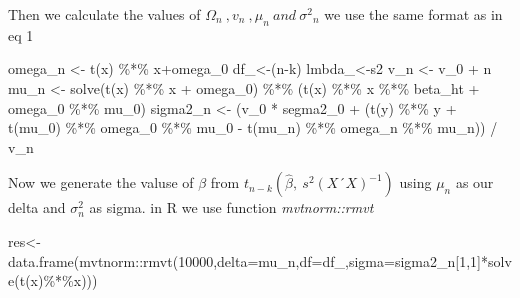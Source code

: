 \documentclass[
]{article}
\newenvironment{Shaded}{\begin{snugshade}}{\end{snugshade}}
\newcommand{\AttributeTok}[1]{\textcolor[rgb]{0.77,0.63,0.00}{#1}}
\newcommand{\DecValTok}[1]{\textcolor[rgb]{0.00,0.00,0.81}{#1}}
\newcommand{\FunctionTok}[1]{\textcolor[rgb]{0.00,0.00,0.00}{#1}}
\newcommand{\NormalTok}[1]{#1}
\newcommand{\OtherTok}[1]{\textcolor[rgb]{0.56,0.35,0.01}{#1}}
\newcommand{\SpecialCharTok}[1]{\textcolor[rgb]{0.00,0.00,0.00}{#1}}
\begin{document}
Then we calculate the values of
\(\Omega_n \ ,v_n \ ,\mu_n \ and \ \sigma{^2}{_n}\) we use the same
format as in eq 1

\begin{Shaded}
\begin{Highlighting}[]
\NormalTok{omega\_n }\OtherTok{\textless{}{-}} \FunctionTok{t}\NormalTok{(x) }\SpecialCharTok{\%*\%}\NormalTok{ x}\SpecialCharTok{+}\NormalTok{omega\_0}
\NormalTok{df\_}\OtherTok{\textless{}{-}}\NormalTok{(n}\SpecialCharTok{{-}}\NormalTok{k)}
\NormalTok{lmbda\_}\OtherTok{\textless{}{-}}\NormalTok{s2}
\NormalTok{v\_n }\OtherTok{\textless{}{-}}\NormalTok{ v\_0 }\SpecialCharTok{+}\NormalTok{ n}
\NormalTok{mu\_n }\OtherTok{\textless{}{-}} \FunctionTok{solve}\NormalTok{(}\FunctionTok{t}\NormalTok{(x) }\SpecialCharTok{\%*\%}\NormalTok{ x }\SpecialCharTok{+}\NormalTok{ omega\_0) }\SpecialCharTok{\%*\%}\NormalTok{ (}\FunctionTok{t}\NormalTok{(x) }\SpecialCharTok{\%*\%}\NormalTok{ x }\SpecialCharTok{\%*\%}\NormalTok{ beta\_ht }\SpecialCharTok{+}\NormalTok{ omega\_0 }\SpecialCharTok{\%*\%}\NormalTok{ mu\_0)}
\NormalTok{sigma2\_n }\OtherTok{\textless{}{-}}\NormalTok{ (v\_0 }\SpecialCharTok{*}\NormalTok{ segma2\_0 }\SpecialCharTok{+}\NormalTok{ (}\FunctionTok{t}\NormalTok{(y) }\SpecialCharTok{\%*\%}\NormalTok{ y }\SpecialCharTok{+} \FunctionTok{t}\NormalTok{(mu\_0) }\SpecialCharTok{\%*\%}\NormalTok{ omega\_0}
                               \SpecialCharTok{\%*\%}\NormalTok{ mu\_0 }\SpecialCharTok{{-}} \FunctionTok{t}\NormalTok{(mu\_n) }\SpecialCharTok{\%*\%}\NormalTok{ omega\_n }\SpecialCharTok{\%*\%}\NormalTok{ mu\_n)) }\SpecialCharTok{/}\NormalTok{ v\_n}
\end{Highlighting}
\end{Shaded}

Now we generate the valuse of \(\beta\) from
\(t_{n-k}(\hat\beta,\ s^2(X´X)^{-1} )\) using \(\mu_n\) as our delta and
\(\sigma^2_n\) as sigma. in R we use function \emph{mvtnorm::rmvt}

\begin{Shaded}
\begin{Highlighting}[]
\NormalTok{res}\OtherTok{\textless{}{-}}\FunctionTok{data.frame}\NormalTok{(mvtnorm}\SpecialCharTok{::}\FunctionTok{rmvt}\NormalTok{(}\DecValTok{10000}\NormalTok{,}\AttributeTok{delta=}\NormalTok{mu\_n,}\AttributeTok{df=}\NormalTok{df\_,}\AttributeTok{sigma=}\NormalTok{sigma2\_n[}\DecValTok{1}\NormalTok{,}\DecValTok{1}\NormalTok{]}\SpecialCharTok{*}\FunctionTok{solve}\NormalTok{(}\FunctionTok{t}\NormalTok{(x)}\SpecialCharTok{\%*\%}\NormalTok{x)))}
\end{Highlighting}
\end{Shaded}
\end{document}
